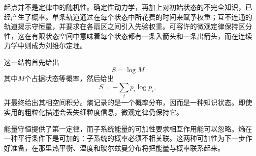 起点并不是定律中的随机性。确定性动力学，再加上对初始状态的不完全知识，已经产生了概率。单条轨道通过在每个状态中所花费的时间来赋予权重；互不连通的轨道揭示守恒量，并要求在各扇区之间引入先验权重。可容许的微观定律保持区分性，这在有限状态空间中意味着每个状态都有一条入箭头和一条出箭头，而在连续力学中则成为刘维尔定理。

这一结构首先给出
\begin{equation}
 S=\log M
\end{equation}
其中\(M\)个占据状态等概率，然后给出
\begin{equation}
 S=-\sum_i p_i\log p_i,
\end{equation}
并最终给出其相空间积分。熵记录的是一个概率分布，因而是一种知识状态。即使实用的粗粒化描述会丢失细粒度信息，微观定律仍保持它。

能量守恒提供了第一定律，而子系统能量的可加性要求相互作用能可以忽略。熵在一种平行条件下是可加的：子系统的概率必须不相关联。这两种可加性为下一步作好准备，在那里热平衡、温度和玻尔兹曼分布将把能量与概率联系起来。